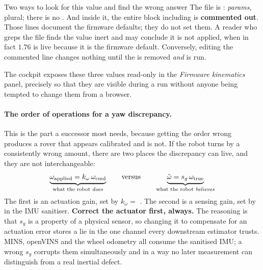 \begin{trapbox}{Two ways to look for this value and find the wrong answer}
The file is : \emph{params}, plural; there is no
. And inside it, the entire  block
including  is \textbf{commented
out}. Those lines document the firmware defaults; they do not set them. A
reader who greps the file finds the value inert and may conclude it is not
applied, when in fact $1.76$ is live because it is the firmware default.
Conversely, editing the commented line changes nothing until the \code{\#} is
removed \emph{and}  is run.
\end{trapbox}

\noindent The cockpit exposes these three values read-only in the
\emph{Firmware kinematics} panel, precisely so that they are visible during a
run without anyone being tempted to change them from a browser.

\paragraph{The order of operations for a yaw discrepancy.}
This is the part a successor most needs, because getting the order wrong
produces a rover that appears calibrated and is not. If the robot turns by a
consistently wrong amount, there are two places the discrepancy can live, and
they are not interchangeable:
\begin{equation}
\underbrace{\omega_{\mathrm{applied}} = k_\omega\,\omega_{\mathrm{cmd}}}
           _{\text{what the robot \emph{does}}}
\qquad\text{versus}\qquad
\underbrace{\hat\omega = s_g\,\omega_{\mathrm{true}}}
           _{\text{what the robot \emph{believes}}}
\label{eq:yawtwoplaces}
\end{equation}
The first is an actuation gain, set by $k_\omega =$
. The second is a sensing gain, set by
 in the IMU sanitiser. \textbf{Correct the
actuator first, always.} The reasoning is that $s_g$ is a property of a
physical sensor, so changing it to compensate for an actuation error stores a
lie in the one channel every downstream estimator trusts. MINS, openVINS and
the wheel odometry all consume the sanitised IMU; a wrong $s_g$ corrupts them
simultaneously and in a way no later measurement can distinguish from a real
inertial defect.

